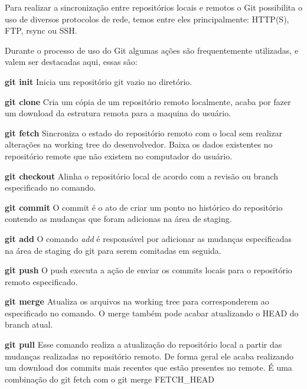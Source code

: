 \documentclass[twosideprint]{politex}
\begin{document}
	Para realizar a sincronização entre repositórios locais e remotos o Git possibilita o uso de diversos protocolos de rede, temos entre eles principalmente: HTTP(S), FTP, rsync ou SSH.
	
	Durante o processo de uso do Git algumas ações são frequentemente utilizadas, e valem ser destacadas aqui, essas são:
	
	\textbf{git init}
	\newline
	Inicia um repositório git vazio no diretório.
	
	\textbf{git clone}
	\newline
	Cria um cópia de um repositório remoto localmente, acaba por fazer um download da estrutura remota para a maquina do usuário.
	
	\textbf{git fetch}
	\newline
	Sincroniza o estado do repositório remoto com o local sem realizar alterações na working tree do desenvolvedor. Baixa os dados existentes no repositório remote que não existem no computador do usuário.
	
	\textbf{git checkout}
	\newline
	Alinha o repositório local de acordo com a revisão ou branch especificado no comando.
	
	\textbf{git commit}
	\newline
	O commit é o ato de criar um ponto no histórico do repositório contendo as mudanças que foram adicionas na área de staging.
	
	\textbf{git add}
	\newline
	O comando \textit{add} é responsável por adicionar as mudanças especificadas na área de staging do git para serem comitadas em seguida.
	
	\textbf{git push}
	\newline
	O push executa a ação de enviar os commits locais para o repositório remoto especificado.
	
	\textbf{git merge}
	\newline
	Atualiza os arquivos na working tree para corresponderem ao especificado no comando. O merge também pode acabar atualizando o HEAD do branch atual.
	
	\textbf{git pull}
	\newline
	Esse comando realiza a atualização do repositório local a partir das mudanças realizadas no repositório remoto. De forma geral ele acaba realizando um download dos commits mais recentes que estão presentes no remote. É uma combinação do git fetch com o git merge FETCH\_HEAD
	
\end{document}
